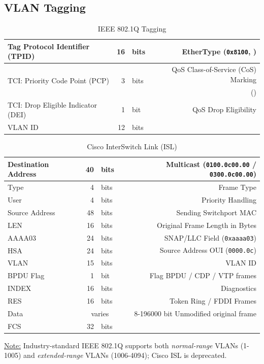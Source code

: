 \documentclass[12pt]{article}
\newif\ifcolor											%
\newcommand{\note}[1]{\ifcolor \colorbox{#1}{Note:}\else \underline{Note:}\fi}
\newcommand{\mc}[3]{\multicolumn{#1}{#2}{#3}}
\newcommand{\mr}[2]{\multirow{#1}{*}{#2}}
\begin{document}
	\subsection{VLAN Tagging \label{subsec:VLAN TAGGING}}
	\begin{table}[H]
	\centering
	\caption{IEEE 802.1Q Tagging \label{tab:802.1Q}}
	\begin{tabular}{| l | r @{ } l | r |}\hline
	Tag Protocol Identifier (TPID)			& 16		& bits		& EtherType (\texttt{0x8100}, \Cref{tab:ETHERTYPE})\\\hline
	\mr{2}{TCI: Priority Code Point (PCP)}	& \mr{2}{3}	& \mr{2}{bits}	& QoS Class-of-Service (CoS) Marking\\
								&		&			& (\Cref{sec:QOS})\\\hline
	TCI: Drop Eligible Indicator (DEI)		& 1		& bit 			& QoS Drop Eligibility\\\hline
	VLAN ID 						& 12		& bits		&\\\hline
	\end{tabular}\end{table}

	\begin{table}[H]
	\centering
	\caption{Cisco InterSwitch Link (ISL) \label{tab:CISCO ISL}}
	\begin{tabular}{| l | r @{ } l | r |}\hline
	Destination Address	& 40	& bits		& Multicast (\texttt{0100.0c00.00} / \texttt{0300.0c00.00})\\\hline
	Type				& 4	& bits		& Frame Type\\\hline
	User				& 4	& bits		& Priority Handling\\\hline
	Source Address		& 48	& bits		& Sending Switchport MAC\\\hline
	LEN				& 16	& bits		& Original Frame Length in Bytes\\\hline
	AAAA03			& 24	& bits		& SNAP/LLC Field (\texttt{0xaaaa03})\\\hline
	HSA				& 24	& bits		& Source Address OUI (\texttt{0000.0c})\\\hline
	VLAN				& 15	& bits		& VLAN ID\\\hline
	BPDU Flag			& 1	& bit 			& Flag BPDU / CDP / VTP frames\\\hline
	INDEX			& 16	& bits		& Diagnostics\\\hline
	RES				& 16	& bits		& Token Ring / FDDI Frames\\\hline
	Data				& \mc{2}{c|}{varies}	& 8-196000 bit Unmodified original frame\\\hline
	FCS				& 32	& bits		&\\\hline
	\end{tabular}\end{table}
	\note{Goldenrod} Industry-standard IEEE 802.1Q supports both \textit{normal-range} VLANs (1-1005) and \textit{extended-range} VLANs (1006-4094); Cisco ISL is deprecated.
\end{document}

